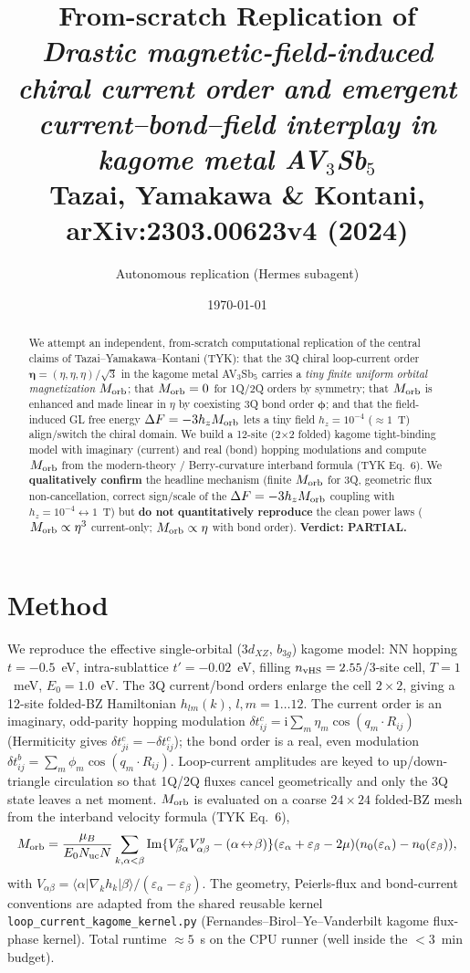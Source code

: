 \documentclass[11pt]{article}
\title{From-scratch Replication of\\
\emph{Drastic magnetic-field-induced chiral current order and emergent
current--bond--field interplay in kagome metal AV$_3$Sb$_5$}\\
\large Tazai, Yamakawa \& Kontani, arXiv:2303.00623v4 (2024)}
\author{Autonomous replication (Hermes subagent)}
\date{\today}
\begin{document}
\maketitle

\begin{abstract}
We attempt an independent, from-scratch computational replication of the central
claims of Tazai--Yamakawa--Kontani (TYK): that the 3Q chiral loop-current order
$\boldsymbol\eta=(\eta,\eta,\eta)/\sqrt3$ in the kagome metal AV$_3$Sb$_5$
carries a \emph{tiny finite uniform orbital magnetization} $M_{\rm orb}$; that
$M_{\rm orb}=0$ for 1Q/2Q orders by symmetry; that $M_{\rm orb}$ is enhanced and
made linear in $\eta$ by coexisting 3Q bond order $\boldsymbol\phi$; and that the
field-induced GL free energy $\Delta F=-3h_z M_{\rm orb}$ lets a tiny field
$h_z=10^{-4}$ ($\approx 1$~T) align/switch the chiral domain. We build a 12-site
(2$\times$2 folded) kagome tight-binding model with imaginary (current) and real
(bond) hopping modulations and compute $M_{\rm orb}$ from the modern-theory /
Berry-curvature interband formula (TYK Eq.~6). We \textbf{qualitatively confirm}
the headline mechanism (finite $M_{\rm orb}$ for 3Q, geometric flux
non-cancellation, correct sign/scale of the $\Delta F=-3h_zM_{\rm orb}$ coupling
with $h_z=10^{-4}\leftrightarrow 1$~T) but \textbf{do not quantitatively
reproduce} the clean power laws ($M_{\rm orb}\propto\eta^3$ current-only;
$M_{\rm orb}\propto\eta$ with bond order). \textbf{Verdict: PARTIAL.}
\end{abstract}

\section{Method}
We reproduce the effective single-orbital ($3d_{XZ}$, $b_{3g}$) kagome model:
NN hopping $t=-0.5$~eV, intra-sublattice $t'=-0.02$~eV, filling
$n_{\rm vHS}=2.55$/3-site cell, $T=1$~meV, $E_0=1.0$~eV. The 3Q current/bond
orders enlarge the cell $2\times2$, giving a 12-site folded-BZ Hamiltonian
$h_{lm}(k)$, $l,m=1\dots12$. The current order is an imaginary, odd-parity
hopping modulation $\delta t^c_{ij}=\mathrm{i}\sum_m\eta_m\cos(q_m\!\cdot\!R_{ij})$
(Hermiticity gives $\delta t^c_{ji}=-\delta t^c_{ij}$); the bond order is a
real, even modulation $\delta t^b_{ij}=\sum_m\phi_m\cos(q_m\!\cdot\!R_{ij})$.
Loop-current amplitudes are keyed to up/down-triangle circulation so that 1Q/2Q
fluxes cancel geometrically and only the 3Q state leaves a net moment.
$M_{\rm orb}$ is evaluated on a coarse $24\times24$ folded-BZ mesh from the
interband velocity formula (TYK Eq.~6),
\[
M_{\rm orb}=\frac{\mu_B}{E_0 N_{\rm uc} N}\sum_{k,\alpha<\beta}
\mathrm{Im}\{V^x_{\beta\alpha}V^y_{\alpha\beta}-(\alpha\!\leftrightarrow\!\beta)\}
(\varepsilon_\alpha+\varepsilon_\beta-2\mu)(n_0(\varepsilon_\alpha)-n_0(\varepsilon_\beta)),
\]
with $V_{\alpha\beta}=\langle\alpha|\nabla_k h_k|\beta\rangle/(\varepsilon_\alpha-\varepsilon_\beta)$.
The geometry, Peierls-flux and bond-current conventions are adapted from the
shared reusable kernel \texttt{loop\_current\_kagome\_kernel.py}
(Fernandes--Birol--Ye--Vanderbilt kagome flux-phase kernel). Total runtime
$\approx 5$~s on the CPU runner (well inside the $<3$~min budget).
\end{document}
